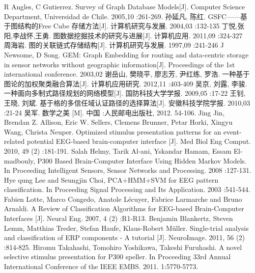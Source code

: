 \documentclass[a4paper]{ecust_thesis_openning}
\newcommand\journal[1]{#1}
\begin{document}
\begin{thebibliography}{99}
\setlength{\itemsep}{-0.4ex}
	 R Angles, C Gutierrez.  Survey of Graph Database Models[J]. \journal{Computer Science Department, Universidad de Chile}. 2005,10 :261-269.
	 孙延凡, 陈红.  GSFC——基于图结构的Free Cube 存储方法[J]. \journal{计算机研究与发展}. 2004,03 :132-135
	 丁悦,张阳,李战怀,王勇.  图数据挖掘技术的研究与进展[J]. \journal{计算机应用}. 2011,09 :324-327
	 周海岩.  图的关联链式存储结构[J]. \journal{计算机研究与发展}. 1997,09 :241-246
	 J Newsome, D Song.  GEM: Graph Embedding for routing and data-centric storage in sensor networks without geographic information[J]. \journal{Proceedings of the 1st international conference}. 2003,02
	谢岳山, 樊晓平, 廖志芳, 尹红练, 罗浩.  一种基于图论的加权聚类融合算法[J]. \journal{计算机应用研究}. 2012,11 :403-409
	吴京, 刘露, 李骏.  一种面向多制式路径规划的网络模型[J]. \journal{国防科技大学学报}. 2009,05 :17-22
	王钊, 王晓, 刘斌.  基于格的多信任域认证路径的选择算法[J]. \journal{安徽科技学院学报}. 2010,03 :21-24
	吴军. 数学之美 [M]. 中国 :人民邮电出版社, 2012. 54-106.
	 Jing Jin, Brendan Z. Allison, Eric W. Sellers, Clemens Brunner, Petar Horki, Xingyu Wang, Christa Neuper. Optimized stimulus presentation patterns for an event-related potential EEG-based brain-computer interface [J].  \journal{Med Biol Eng Comput}. 2010, 49 (2) :181-191.
	 Salah Helmy, Tarik Al-ani, Yskandar Hamam, Essam El-madbouly, P300 Based Brain-Computer Interface Using Hidden Markov Models. In Proceeding \journal{Intelligent Sensors, Sensor Networks and Processing}.  2008 :127-131.
	 Hye qung Lee and Seungjin Choi, PCA+HMM+SVM for EEG pattern classification.  In Proceeding \journal{Signal Processing and Its Application}. 2003 :541-544.
	 Fabien Lotte, Marco Congedo, Anatole L\'ecuyer, Fabrice Larmarche and Bruno Arnaldi. A Review of Classification Algorithms for EEG-based Brain-Computer Interfaces [J].  \journal{Neural Eng}. 2007, 4 (2) :R1-R13.
	 Benjamin Blankertz, Steven Lemm, Matthias Treder, Stefan Haufe, Klaus-Robert M\"uller.  Single-trial analysis and classification of ERP components - A tutorial [J].  \journal{NeuroImage}.  2011, 56 (2) :814-825.
	 Hiromu Takahashi, Tomohiro Yoshikawa, Takeshi Furuhashi.  A novel selective stimulus presentation for P300 speller. In Proceeding \journal{33rd Annual International Conference of the IEEE EMBS}. 2011. 1:5770-5773.

\end{thebibliography}
\end{document}
